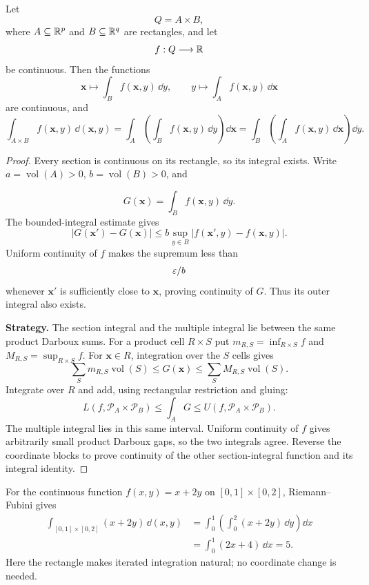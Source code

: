\begin{theorem}
\label{thm:riemann-fubini}
Let
\[
Q=A\times B,
\]
where $A\subseteq\mathbb{R}^p$ and $B\subseteq\mathbb{R}^q$ are rectangles, and let
\[
f:Q\longrightarrow\mathbb{R}
\]
be continuous.  Then the functions
\[
\mathbf{x}\longmapsto\int_Bf(\mathbf{x},y)\,\dd y,
\qquad
y\longmapsto\int_Af(\mathbf{x},y)\,\dd\mathbf{x}
\]
are continuous, and
\[
\int_{A\times B}f(\mathbf{x},y)\,\dd(\mathbf{x},y)
=
\int_A\left(\int_Bf(\mathbf{x},y)\,\dd y\right)\dd\mathbf{x}
=
\int_B\left(\int_Af(\mathbf{x},y)\,\dd\mathbf{x}\right)\dd y.
\]
\end{theorem}
\begin{proof}
Every section is continuous on its rectangle, so its integral exists.
Write $a=\operatorname{vol}(A)>0$, $b=\operatorname{vol}(B)>0$, and

\[
G(\mathbf{x})=\int_B f(\mathbf{x},y)\,\dd y.
\]
 The bounded-integral estimate gives
\[
|G(\mathbf{x}')-G(\mathbf{x})|\leq b\sup_{y\in B}|f(\mathbf{x}',y)-f(\mathbf{x},y)|.
\]
Uniform continuity of $f$ makes the supremum less than
\[
\varepsilon/b
\]
 whenever
$\mathbf{x}'$ is sufficiently close to $\mathbf{x}$, proving continuity of $G$.
Thus its outer integral also exists.

\textbf{Strategy.} The section integral and the multiple integral lie
between the same product Darboux sums. For a product cell $R\times S$ put
$m_{R,S}=\inf_{R\times S}f$ and $M_{R,S}=\sup_{R\times S}f$.
For $\mathbf{x}\in R$, integration over the $S$ cells gives
\[
\sum_Sm_{R,S}\operatorname{vol}(S)\leq G(\mathbf{x})
\leq\sum_SM_{R,S}\operatorname{vol}(S).
\]
Integrate over $R$ and add, using rectangular restriction and gluing:
\[
L(f,\mathcal P_A\times\mathcal P_B)\leq\int_A G
\leq U(f,\mathcal P_A\times\mathcal P_B).
\]
The multiple integral lies in this same interval. Uniform continuity of
$f$ gives arbitrarily small product Darboux gaps, so the two integrals
agree. Reverse the coordinate blocks to prove continuity of the other
section-integral function and its integral identity.
\end{proof}



\begin{example}
For the continuous function $f(x,y)=x+2y$ on $[0,1]\times[0,2]$,
Riemann--Fubini gives
\begin{align*}
\int_{[0,1]\times[0,2]}(x+2y)\,\dd(x,y)
&=\int_0^1\left(\int_0^2(x+2y)\,\dd y\right)\dd x\\
&=\int_0^1(2x+4)\,\dd x=5.
\end{align*}
Here the rectangle makes iterated integration natural; no coordinate change
is needed.
\end{example}

